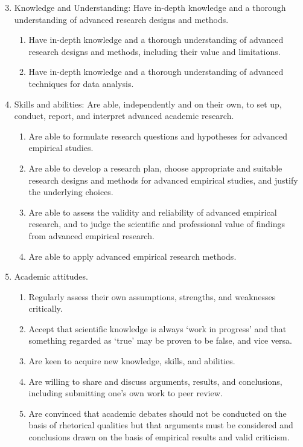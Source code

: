 \begin{enumerate}
    \setcounter{enumi}{2}
    \item Knowledge and Understanding: Have in-depth knowledge and a thorough understanding of advanced research designs and methods.
    \begin{enumerate}
        \item[3.1.] Have in-depth knowledge and a thorough understanding of advanced research designs and methods, including their value and limitations.
        \item[3.2.] Have in-depth knowledge and a thorough understanding of advanced techniques for data analysis.
    \end{enumerate}

    \item Skills and abilities: Are able, independently and on their own, to set up, conduct, report, and interpret advanced academic research.
    \begin{enumerate}
        \item[4.1.] Are able to formulate research questions and hypotheses for advanced empirical studies.
        \item[4.2.] Are able to develop a research plan, choose appropriate and suitable research designs and methods for advanced empirical studies, and justify the underlying choices.
        \item[4.3.] Are able to assess the validity and reliability of advanced empirical research, and to judge the scientific and professional value of findings from advanced empirical research.
        \item[4.4.] Are able to apply advanced empirical research methods.
    \end{enumerate}

    \item Academic attitudes.
    \begin{enumerate}
        \item[6.1.] Regularly assess their own assumptions, strengths, and weaknesses critically.
        \item[6.2.] Accept that scientific knowledge is always `work in progress' and that something regarded as `true' may be proven to be false, and vice versa.
        \item[6.3.] Are keen to acquire new knowledge, skills, and abilities.
        \item[6.4.] Are willing to share and discuss arguments, results, and conclusions, including submitting one's own work to peer review.
        \item[6.5.] Are convinced that academic debates should not be conducted on the basis of rhetorical qualities but that arguments must be considered and conclusions drawn on the basis of empirical results and valid criticism.
    \end{enumerate}
\end{enumerate}
